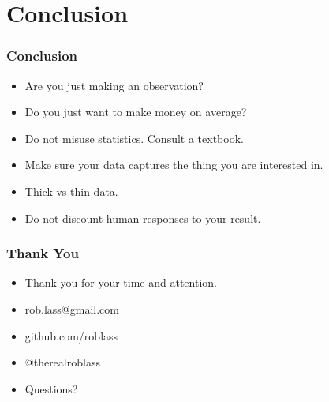 \documentclass{beamer}
\begin{document}
\section{Conclusion}
\begin{frame}
	\frametitle{Conclusion}
	\begin{itemize}
        \item<1->Are you just making an observation?
        \item<2->Do you just want to make money on average?
        \item<3->Do not misuse statistics.  Consult a textbook.
        \item<4->Make sure your data captures the thing you are interested in.
        \item<5->Thick vs thin data.
        \item<6->Do not discount human responses to your result.
    \end{itemize}
\end{frame}


\begin{frame}
\frametitle{Thank You}
\begin{itemize}
    \item Thank you for your time and attention.
    \item rob.lass@gmail.com
    \item github.com/roblass
    \item @therealroblass
    \item Questions?
\end{itemize}
\end{frame}
\end{document}
